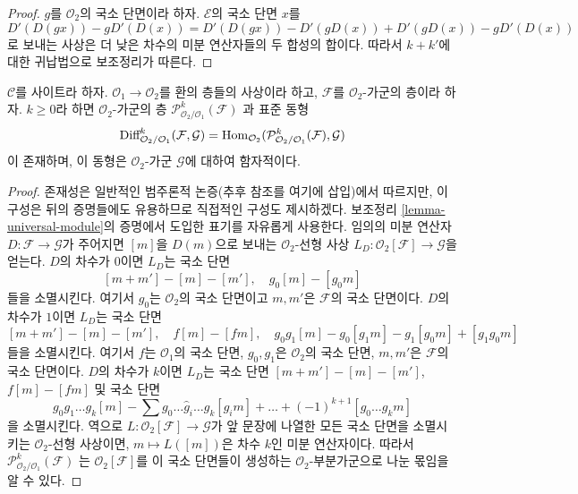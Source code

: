 \begin{proof}
$g$를 $\mathcal{O}_2$의 국소 단면이라 하자.
$\mathcal{E}$의 국소 단면 $x$를
$$
D'(D(gx)) - gD'(D(x)) = D'(D(gx)) - D'(gD(x)) + D'(gD(x)) - gD'(D(x))
$$
로 보내는 사상은 더 낮은 차수의 미분 연산자들의 두 합성의 합이다.
따라서 $k + k'$에 대한 귀납법으로 보조정리가 따른다.
\end{proof}

\begin{lemma}
\label{lemma-module-principal-parts}
$\mathcal{C}$를 사이트라 하자.
$\mathcal{O}_1 \to \mathcal{O}_2$를 환의 층들의 사상이라 하고,
$\mathcal{F}$를 $\mathcal{O}_2$-가군의 층이라 하자. $k \geq 0$라 하면
$\mathcal{O}_2$-가군의 층
$\mathcal{P}^k_{\mathcal{O}_2/\mathcal{O}_1}(\mathcal{F})$
과 표준 동형
$$
\text{Diff}^k_{\mathcal{O}_2/\mathcal{O}_1}(\mathcal{F}, \mathcal{G}) =
\mathop{\mathrm{Hom}}\nolimits_{\mathcal{O}_2}(
\mathcal{P}^k_{\mathcal{O}_2/\mathcal{O}_1}(\mathcal{F}), \mathcal{G})
$$
이 존재하며, 이 동형은 $\mathcal{O}_2$-가군 $\mathcal{G}$에 대하여
함자적이다.
\end{lemma}

\begin{proof}
존재성은 일반적인 범주론적 논증(추후 참조를 여기에 삽입)에서 따르지만,
이 구성은 뒤의 증명들에도 유용하므로 직접적인 구성도 제시하겠다.
보조정리 \ref{lemma-universal-module}의 증명에서 도입한 표기를
자유롭게 사용한다. 임의의 미분 연산자
$D : \mathcal{F} \to \mathcal{G}$가 주어지면 $[m]$을 $D(m)$으로 보내는
$\mathcal{O}_2$-선형 사상
$L_D : \mathcal{O}_2[\mathcal{F}] \to \mathcal{G}$을 얻는다.
$D$의 차수가 $0$이면 $L_D$는 국소 단면
$$
[m + m'] - [m] - [m'],\quad
g_0[m] - [g_0m]
$$
들을 소멸시킨다. 여기서 $g_0$는 $\mathcal{O}_2$의 국소 단면이고
$m, m'$은 $\mathcal{F}$의 국소 단면이다. $D$의 차수가 $1$이면
$L_D$는 국소 단면
$$
[m + m'] - [m] - [m'],\quad
f[m] - [fm], \quad
g_0g_1[m] - g_0[g_1m] - g_1[g_0m] + [g_1g_0m]
$$
들을 소멸시킨다. 여기서 $f$는 $\mathcal{O}_1$의 국소 단면,
$g_0, g_1$은 $\mathcal{O}_2$의 국소 단면, $m, m'$은
$\mathcal{F}$의 국소 단면이다. $D$의 차수가 $k$이면 $L_D$는
국소 단면 $[m + m'] - [m] - [m']$, $f[m] - [fm]$ 및 국소 단면
$$
g_0g_1\ldots g_k[m] - \sum g_0 \ldots \hat g_i \ldots g_k[g_im] + \ldots
+(-1)^{k + 1}[g_0\ldots g_km]
$$
을 소멸시킨다. 역으로 $L : \mathcal{O}_2[\mathcal{F}] \to \mathcal{G}$가
앞 문장에 나열한 모든 국소 단면을 소멸시키는 $\mathcal{O}_2$-선형
사상이면, $m \mapsto L([m])$은 차수 $k$인 미분 연산자이다. 따라서
$\mathcal{P}^k_{\mathcal{O}_2/\mathcal{O}_1}(\mathcal{F})$
는 $\mathcal{O}_2[\mathcal{F}]$를 이 국소 단면들이 생성하는
$\mathcal{O}_2$-부분가군으로 나눈 몫임을 알 수 있다.
\end{proof}

